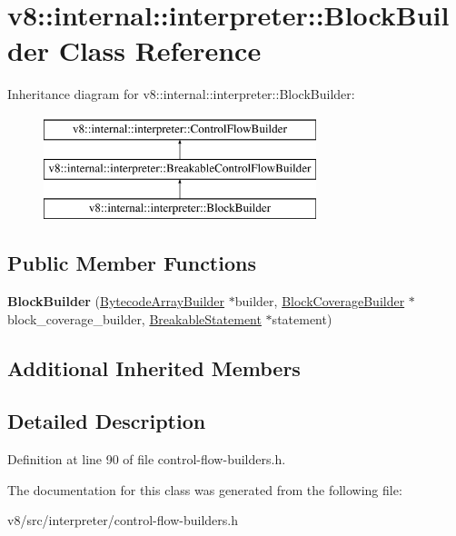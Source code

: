 \hypertarget{classv8_1_1internal_1_1interpreter_1_1BlockBuilder}{}\section{v8\+:\+:internal\+:\+:interpreter\+:\+:Block\+Builder Class Reference}
\label{classv8_1_1internal_1_1interpreter_1_1BlockBuilder}
Inheritance diagram for v8\+:\+:internal\+:\+:interpreter\+:\+:Block\+Builder\+:\begin{figure}[H]
\begin{center}
\leavevmode
\includegraphics[height=3.000000cm]{classv8_1_1internal_1_1interpreter_1_1BlockBuilder}
\end{center}
\end{figure}
\subsection*{Public Member Functions}
\begin{DoxyCompactItemize}
\item 
\mbox{\label{classv8_1_1internal_1_1interpreter_1_1BlockBuilder_a937cb49529d273dc4ae2b09b5817b4a2}} 
{\bfseries Block\+Builder} (\mbox{\hyperlink{classv8_1_1internal_1_1interpreter_1_1BytecodeArrayBuilder}{Bytecode\+Array\+Builder}} $\ast$builder, \mbox{\hyperlink{classv8_1_1internal_1_1interpreter_1_1BlockCoverageBuilder}{Block\+Coverage\+Builder}} $\ast$block\+\_\+coverage\+\_\+builder, \mbox{\hyperlink{classv8_1_1internal_1_1BreakableStatement}{Breakable\+Statement}} $\ast$statement)
\end{DoxyCompactItemize}
\subsection*{Additional Inherited Members}


\subsection{Detailed Description}


Definition at line 90 of file control-\/flow-\/builders.\+h.



The documentation for this class was generated from the following file\+:\begin{DoxyCompactItemize}
\item 
v8/src/interpreter/control-\/flow-\/builders.\+h\end{DoxyCompactItemize}

